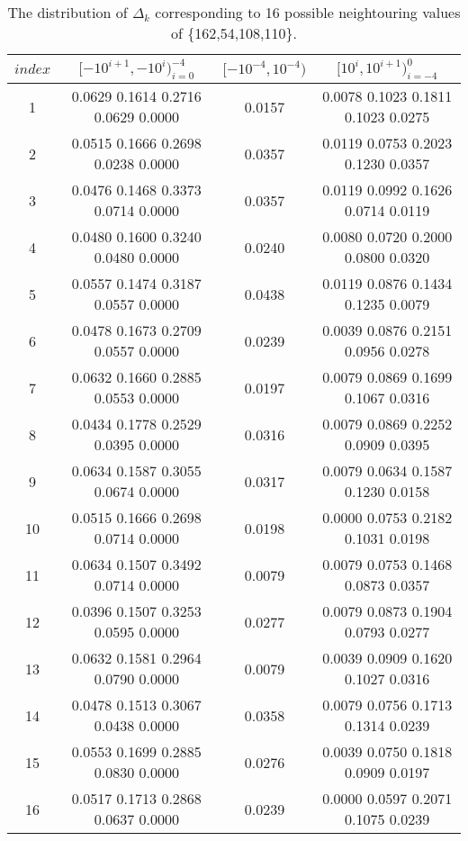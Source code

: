 \documentclass[twocolumn]{svjour3}
\begin{document}
\begin{table*}[!htp]
\center\caption{The distribution of $\Delta_k$ corresponding to 16 possible neightouring values of \{162,54,108,110\}.}
\begin{tabular}{c|c|c|c}
  \hline  $index$      &  $[-10^{i+1}, -10^{i})_{i=0}^{-4}$       & $[-10^{-4}, 10^{-4})$ &    $[10^{i}, 10^{i+1})_{i=-4}^0$\\
  \hline   1  &  0.0629 0.1614 0.2716 0.0629 0.0000 &0.0157 &0.0078 0.1023 0.1811 0.1023 0.0275  \\
  \hline   2  &  0.0515 0.1666 0.2698 0.0238 0.0000 &0.0357 &0.0119 0.0753 0.2023 0.1230 0.0357  \\
  \hline   3  &  0.0476 0.1468 0.3373 0.0714 0.0000 &0.0357 &0.0119 0.0992 0.1626 0.0714 0.0119  \\\hline
  \hline   4  &  0.0480 0.1600 0.3240 0.0480 0.0000 &0.0240 &0.0080 0.0720 0.2000 0.0800 0.0320  \\
  \hline   5  &  0.0557 0.1474 0.3187 0.0557 0.0000 &0.0438 &0.0119 0.0876 0.1434 0.1235 0.0079  \\
  \hline   6  &  0.0478 0.1673 0.2709 0.0557 0.0000 &0.0239 &0.0039 0.0876 0.2151 0.0956 0.0278  \\
  \hline   7  &  0.0632 0.1660 0.2885 0.0553 0.0000 &0.0197 &0.0079 0.0869 0.1699 0.1067 0.0316  \\
  \hline   8  &  0.0434 0.1778 0.2529 0.0395 0.0000 &0.0316 &0.0079 0.0869 0.2252 0.0909 0.0395  \\
  \hline   9  &  0.0634 0.1587 0.3055 0.0674 0.0000 &0.0317 &0.0079 0.0634 0.1587 0.1230 0.0158  \\
  \hline   10 &  0.0515 0.1666 0.2698 0.0714 0.0000 &0.0198 &0.0000 0.0753 0.2182 0.1031 0.0198  \\
  \hline   11 &  0.0634 0.1507 0.3492 0.0714 0.0000 &0.0079 &0.0079 0.0753 0.1468 0.0873 0.0357   \\
  \hline   12 &  0.0396 0.1507 0.3253 0.0595 0.0000 &0.0277 &0.0079 0.0873 0.1904 0.0793 0.0277   \\
  \hline   13 &  0.0632 0.1581 0.2964 0.0790 0.0000 &0.0079 &0.0039 0.0909 0.1620 0.1027 0.0316   \\
  \hline   14 &  0.0478 0.1513 0.3067 0.0438 0.0000 &0.0358 &0.0079 0.0756 0.1713 0.1314 0.0239   \\
  \hline   15 &  0.0553 0.1699 0.2885 0.0830 0.0000 &0.0276 &0.0039 0.0750 0.1818 0.0909 0.0197   \\
  \hline   16 &  0.0517 0.1713 0.2868 0.0637 0.0000 &0.0239 &0.0000 0.0597 0.2071 0.1075 0.0239   \\
  \hline
\end{tabular}
\label{table:result}
\end{table*}
\end{document}
